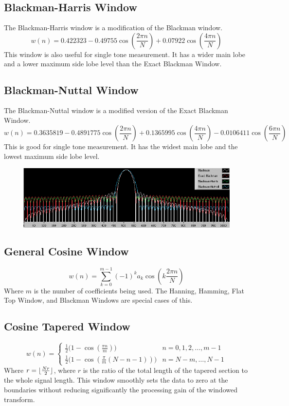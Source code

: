 \documentclass{article}
\theoremstyle{mystyle}
\DeclarePairedDelimiter\floor{\lfloor}{\rfloor}
\begin{document}
\subsection{Blackman-Harris Window}
\noindent The Blackman-Harris window is a modification of the Blackman window.
\begin{equation}
w(n) = 0.422323 - 0.49755\cos(\frac{2\pi n}{N}) + 0.07922\cos(\frac{4\pi n}{N})
\end{equation}
\noindent This window is also useful for single tone measurement. It has a wider main lobe and a lower maximum side lobe level than the Exact Blackman Window.
\subsection{Blackman-Nuttal Window}
\noindent The Blackman-Nuttal window is a modified version of the Exact Blackman Window. 
\begin{equation}
w(n) = 0.3635819 - 0.4891775\cos(\frac{2\pi n}{N}) + 0.1365995\cos(\frac{4\pi n}{N}) - 0.0106411\cos(\frac{6\pi n}{N})
\end{equation}
\noindent This is good for single tone measurement. It has the widest main lobe and the lowest maximum side lobe level.
\begin{figure}[htbp]
  \centering
{\includegraphics[scale=0.65]{CDSW_2}}
\end{figure}
\subsection{General Cosine Window}
\begin{equation}
w(n) = \sum_{k=0}^{m-1} (-1)^{k}a_{k}\cos(k\frac{2\pi n}{N})
\end{equation}
\noindent Where $m$ is the number of coefficients being used. The Hanning, Hamming, Flat Top Window, and Blackman Windows are special cases of this.
\subsection{Cosine Tapered Window}
\begin{equation}
w(n) = \begin{cases} \frac{1}{2}\big(1-\cos(\frac{\pi n}{m})\big) & n=0,1,2,\hdots, m-1\\ \frac{1}{2}\big(1-\cos(\frac{\pi}{m}(N-n-1))\big) & n = N-m, \hdots, N-1
\end{cases}
\end{equation}
\noindent Where $r = \floor{\frac{Nr}{2}}$, where $r$ is the ratio of the total length of the tapered section to the whole signal length. This window smoothly sets the data to zero at the boundaries without reducing significantly the processing gain of the windowed transform.
\end{document}
